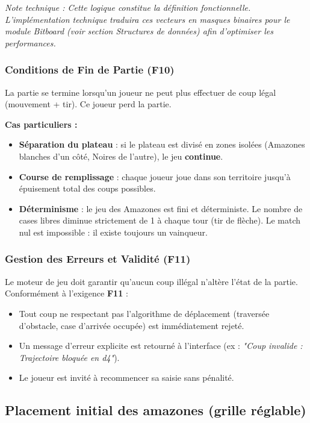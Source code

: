 \documentclass[a4paper]{article}
\begin{document}
\noindent\textit{Note technique : Cette logique constitue la définition fonctionnelle. L’implémentation technique traduira ces vecteurs en masques binaires pour le module Bitboard (voir section Structures de données) afin d’optimiser les performances.}

\subsubsection{Conditions de Fin de Partie (F10)}

La partie se termine lorsqu’un joueur ne peut plus effectuer de coup légal (mouvement + tir). Ce joueur perd la partie.

\textbf{Cas particuliers :}
\begin{itemize}
    \item \textbf{Séparation du plateau} : si le plateau est divisé en zones isolées (Amazones blanches d’un côté, Noires de l’autre), le jeu \textbf{continue}.
    \item \textbf{Course de remplissage} : chaque joueur joue dans son territoire jusqu’à épuisement total des coups possibles.
    \item \textbf{Déterminisme} : le jeu des Amazones est fini et déterministe. Le nombre de cases libres diminue strictement de 1 à chaque tour (tir de flèche). Le match nul est impossible : il existe toujours un vainqueur.
\end{itemize}

\subsubsection{Gestion des Erreurs et Validité (F11)}

Le moteur de jeu doit garantir qu’aucun coup illégal n’altère l’état de la partie. Conformément à l’exigence \textbf{F11} :

\begin{itemize}
    \item Tout coup ne respectant pas l’algorithme de déplacement (traversée d’obstacle, case d’arrivée occupée) est immédiatement rejeté.
    \item Un message d’erreur explicite est retourné à l’interface (ex : \textit{"Coup invalide : Trajectoire bloquée en d4"}).
    \item Le joueur est invité à recommencer sa saisie sans pénalité.
\end{itemize}

\subsection{Placement initial des amazones (grille réglable)}
\end{document}

